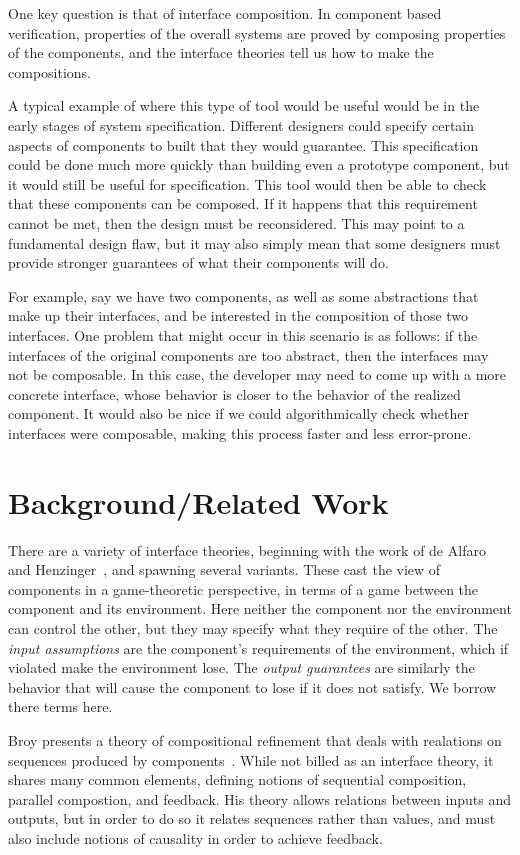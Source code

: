 \documentclass[preprint,11pt]{sigplanconf}
\begin{document}
One key question is that of interface composition.  In component based
verification, properties of the overall systems are proved by composing
properties of the components, and the interface theories tell us how to make
the compositions.

A typical example of where this type of tool would be useful would be in the
early stages of system specification. Different designers could specify certain
aspects of components to built that they would guarantee. This specification
could be done much more quickly than building even a prototype component, but
it would still be useful for specification. This tool would then be able to
check that these components can be composed. If it happens that this
requirement cannot be met, then the design must be reconsidered. This may point
to a fundamental design flaw, but it may also simply mean that some designers
must provide stronger guarantees of what their components will do.

For example, say we have two components, as well as some abstractions that
make up their interfaces, and be interested in the composition of those two
interfaces. One problem that might occur in this scenario is as follows: if the
interfaces of the original components are too abstract, then the interfaces
may not be composable. In this case, the developer may need to come up with a
more concrete interface, whose behavior is closer to the behavior of the
realized component. It would also be nice if we could algorithmically check
whether interfaces were composable, making this process faster and less
error-prone.

\section{Background/Related Work}
There are a variety of interface theories, beginning with the work of de Alfaro
and Henzinger~\cite{interfaceTheories}, and spawning several variants.  These
cast the view of components in a game-theoretic perspective, in terms of a game
between the component and its environment.  Here neither the component nor the
environment can control the other, but they may specify what they require of
the other.  The \emph{input assumptions} are the component's requirements of the
environment, which if violated make the environment lose.  The \emph{output
guarantees} are similarly the behavior that will cause the component to lose
if it does not satisfy.  We borrow there terms here.

Broy presents a theory of compositional refinement that deals with realations on
sequences produced by components~\cite{broy:1997:compositionalRefinement}. While
not billed as an interface theory, it shares many common elements, defining
notions of sequential composition, parallel compostion, and feedback. His theory
allows relations between inputs and outputs, but in order to do so it relates
sequences rather than values, and must also include notions of causality in order
to achieve feedback.
\end{document}
